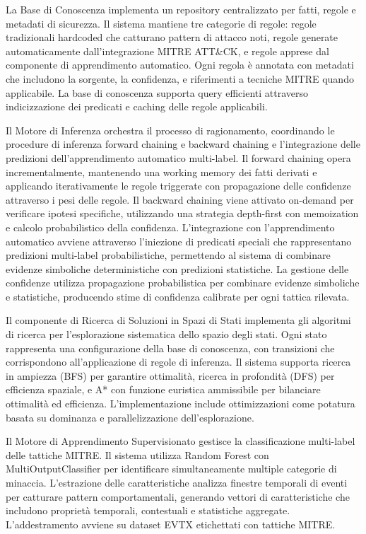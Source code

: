 \documentclass[12pt,a4paper]{report}
\theoremstyle{definition}
\begin{document}
La Base di Conoscenza implementa un repository centralizzato per fatti, regole e metadati di sicurezza. Il sistema mantiene tre categorie di regole: regole tradizionali hardcoded che catturano pattern di attacco noti, regole generate automaticamente dall'integrazione MITRE ATT\&CK, e regole apprese dal componente di apprendimento automatico. Ogni regola è annotata con metadati che includono la sorgente, la confidenza, e riferimenti a tecniche MITRE quando applicabile. La base di conoscenza supporta query efficienti attraverso indicizzazione dei predicati e caching delle regole applicabili.

Il Motore di Inferenza orchestra il processo di ragionamento, coordinando le procedure di inferenza forward chaining e backward chaining e l'integrazione delle predizioni dell'apprendimento automatico multi-label. Il forward chaining opera incrementalmente, mantenendo una working memory dei fatti derivati e applicando iterativamente le regole triggerate con propagazione delle confidenze attraverso i pesi delle regole. Il backward chaining viene attivato on-demand per verificare ipotesi specifiche, utilizzando una strategia depth-first con memoization e calcolo probabilistico della confidenza. L'integrazione con l'apprendimento automatico avviene attraverso l'iniezione di predicati speciali che rappresentano predizioni multi-label probabilistiche, permettendo al sistema di combinare evidenze simboliche deterministiche con predizioni statistiche. La gestione delle confidenze utilizza propagazione probabilistica per combinare evidenze simboliche e statistiche, producendo stime di confidenza calibrate per ogni tattica rilevata.

Il componente di Ricerca di Soluzioni in Spazi di Stati implementa gli algoritmi di ricerca per l'esplorazione sistematica dello spazio degli stati. Ogni stato rappresenta una configurazione della base di conoscenza, con transizioni che corrispondono all'applicazione di regole di inferenza. Il sistema supporta ricerca in ampiezza (BFS) per garantire ottimalità, ricerca in profondità (DFS) per efficienza spaziale, e A* con funzione euristica ammissibile per bilanciare ottimalità ed efficienza. L'implementazione include ottimizzazioni come potatura basata su dominanza e parallelizzazione dell'esplorazione.

Il Motore di Apprendimento Supervisionato gestisce la classificazione multi-label delle tattiche MITRE. Il sistema utilizza Random Forest con MultiOutputClassifier per identificare simultaneamente multiple categorie di minaccia. L'estrazione delle caratteristiche analizza finestre temporali di eventi per catturare pattern comportamentali, generando vettori di caratteristiche che includono proprietà temporali, contestuali e statistiche aggregate. L'addestramento avviene su dataset EVTX etichettati con tattiche MITRE.
\end{document}

